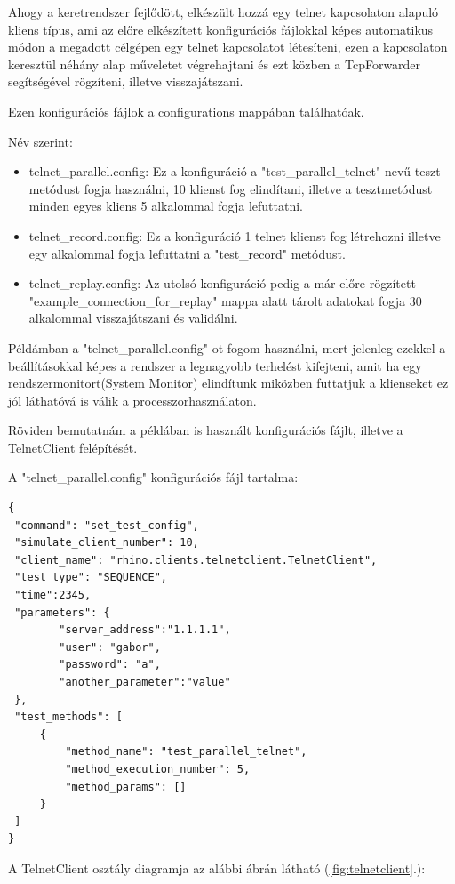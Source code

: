 \documentclass[a4paper,12pt,oneside]{report}
\begin{document}
Ahogy a keretrendszer fejlődött, elkészült hozzá egy telnet kapcsolaton alapuló kliens típus, ami az előre elkészített konfigurációs fájlokkal képes automatikus módon a megadott célgépen egy telnet kapcsolatot létesíteni, ezen a kapcsolaton keresztül néhány alap műveletet végrehajtani és ezt közben a TcpForwarder segítségével rögzíteni, illetve visszajátszani.

Ezen konfigurációs fájlok a configurations mappában találhatóak.

Név szerint:
\begin{itemize}
\itemsep0em
\item telnet\_parallel.config: Ez a konfiguráció a "test\_parallel\_telnet" nevű teszt metódust fogja használni, 10 klienst fog elindítani, illetve a tesztmetódust minden egyes kliens 5 alkalommal fogja lefuttatni.
\item telnet\_record.config: Ez a konfiguráció 1 telnet klienst fog létrehozni illetve egy alkalommal fogja lefuttatni a "test\_record" metódust.
\item telnet\_replay.config: Az utolsó konfiguráció pedig a már előre rögzített "example\_connection\_for\_replay" mappa alatt tárolt adatokat fogja 30 alkalommal visszajátszani és validálni.
\end{itemize}


Példámban a "telnet\_parallel.config"-ot fogom használni, mert jelenleg ezekkel a beállításokkal képes a rendszer a legnagyobb terhelést kifejteni, amit ha egy rendszermonitort(System Monitor) elindítunk miközben futtatjuk a klienseket ez jól láthatóvá is válik a processzorhasználaton.

Röviden bemutatnám a példában is használt konfigurációs fájlt, illetve a TelnetClient felépítését.

A "telnet\_parallel.config" konfigurációs fájl tartalma:

\begin{lstlisting}
{
 "command": "set_test_config",
 "simulate_client_number": 10,
 "client_name": "rhino.clients.telnetclient.TelnetClient",
 "test_type": "SEQUENCE",
 "time":2345,
 "parameters": {
        "server_address":"1.1.1.1",
        "user": "gabor",
        "password": "a",
        "another_parameter":"value"
 },
 "test_methods": [
     {
         "method_name": "test_parallel_telnet",
         "method_execution_number": 5,
         "method_params": []
     }
 ]
}
\end{lstlisting}

A TelnetClient osztály diagramja az alábbi ábrán látható (\ref{fig:telnetclient}.):
\end{document}
